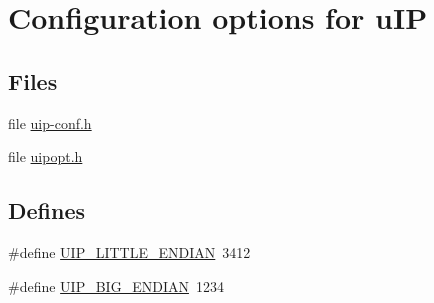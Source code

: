 \hypertarget{group__uipopt}{
\section{Configuration options for uIP}
\label{group__uipopt}
}
\subsection*{Files}
\begin{DoxyCompactItemize}
\item 
file \hyperlink{uip-conf_8h}{uip-\/conf.h}
\item 
file \hyperlink{uipopt_8h}{uipopt.h}
\end{DoxyCompactItemize}
\subsection*{Defines}
\begin{DoxyCompactItemize}
\item 
\#define \hyperlink{group__uipopt_gab6e04358481bd2057524fb874cfa472b}{UIP\_\-LITTLE\_\-ENDIAN}~3412
\item 
\#define \hyperlink{group__uipopt_ga6836f92f3692f3a4429eb599db40cbae}{UIP\_\-BIG\_\-ENDIAN}~1234
\end{DoxyCompactItemize}
